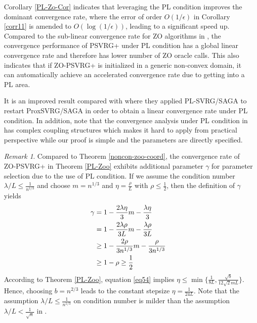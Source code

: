 \documentclass{article}
\theoremstyle{definition}
\theoremstyle{remark}
\newtheorem{remark}[theorem]{Remark}
\begin{document}
Corollary \ref{PL-Zo-Cor} indicates that leveraging the PL condition improves the dominant convergence rate, where the error of
order $O(1/\epsilon)$ in Corollary \ref{corr11} is amended to $O(\log(1/\epsilon))$, leading to a significant speed up.
Compared to the sub-linear convergence rate for ZO algorithms in \cite{duchi2015optimal,nesterov2017random,liu2018zeroth}, the convergence performance of PSVRG+ under PL condition has a global linear convergence rate and therefore has lower number of ZO oracle calls. 
This also indicates that if ZO-PSVRG+ is initialized in a generic non-convex domain, it can automatically achieve an accelerated  convergence rate due to getting into a PL area.


It is an improved result compared with \cite{reddi2016stochastic} where they applied PL-SVRG/SAGA to restart ProxSVRG/SAGA in order to obtain a linear convergence rate under PL condition.
In addition, note that the convergence analysis under PL condition in \cite{ji2019improved} has complex coupling structures which makes it hard to apply from practical perspective while our proof is simple and the parameters are directly specified.


\begin{remark}
Compared to Theorem \ref{noncon-zoo-coord}, the convergence rate of ZO-PSVRG+ in Theorem \ref{PL-Zoo} exhibits additional parameter $\gamma$ for parameter selection due to the use of PL condition. 
If we assume the condition number $\lambda/L\leq \frac{1}{n^{1/3}}$ and choose $m = n^{1/3}$ and $\eta = \frac{\rho}{L}$ with $\rho\leq \frac{1}{2}$, then the definition of $\gamma$ yields  
\begin{align}
\gamma &= 1-\frac{2\lambda\eta}{3} m-\frac{\lambda\eta}{3}\notag \\
& = 1 - \frac{2\lambda\rho}{3L}m - \frac{\lambda\rho}{3L}\notag\\
& \geq  1 - \frac{2\rho}{3n^{1/3}}m - \frac{\rho}{3n^{1/3}}\notag\\
& \geq  1 - \rho \geq \frac{1}{2}\label{eq54}
\end{align}
According to Theorem \ref{PL-Zoo}, equation \eqref{eq54} implies $\eta \leq \min\{\frac{1}{8L}, \frac{\sqrt{b}}{12\sqrt{2} m L }\}$. 
Hence, choosing $b = n^{2/3}$ leads to the constant stepsize  $\eta = \frac{1}{24 L}$.
Note that the assumption $\lambda/L \leq \frac{1}{{n}^{1/3}}$ on condition number is milder than the assumption $\lambda/L < \frac{1}{\sqrt{n}}$ in \cite{reddi2016proximal}.
\end{remark}
\end{document}
